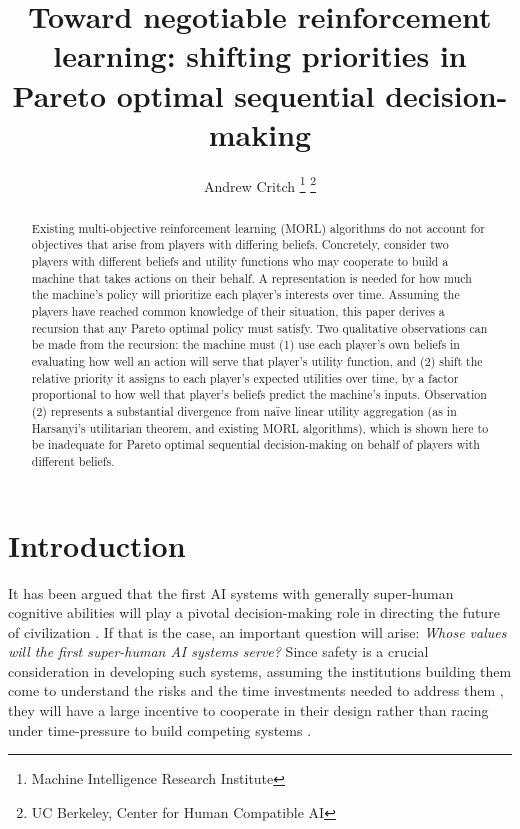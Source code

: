 \documentclass{article}  %
\title{\LARGE \bf
Toward negotiable reinforcement learning: shifting priorities in Pareto optimal sequential decision-making
}
\author{Andrew Critch%
\thanks{Machine Intelligence Research Institute}
\thanks{UC Berkeley, Center for Human Compatible AI}%
}
\begin{document}
\maketitle
\thispagestyle{empty}
\pagestyle{empty}


\begin{abstract}
Existing multi-objective reinforcement learning (MORL) algorithms do not account for objectives that arise from players with differing beliefs.  Concretely, consider two players with different beliefs and utility functions who may cooperate to build a machine that takes actions on their behalf.  A representation is needed for how much the machine's policy will prioritize each player's interests over time.  Assuming the players have reached common knowledge of their situation, this paper derives a recursion that any Pareto optimal policy must satisfy.  Two qualitative observations can be made from the recursion: the machine must (1) use each player's own beliefs in evaluating how well an action will serve that player's utility function, and (2) shift the relative priority it assigns to each player's expected utilities over time, by a factor proportional to how well that player's beliefs predict the machine's inputs.  Observation (2) represents a substantial divergence from na\"{i}ve linear utility aggregation (as in Harsanyi's utilitarian theorem, and existing MORL algorithms), which is shown here to be inadequate for Pareto optimal sequential decision-making on behalf of players with different beliefs.
\end{abstract}



\section{Introduction}

It has been argued that the first AI systems with generally super-human cognitive abilities will play a pivotal decision-making role in directing the future of civilization \citep{bostrom2014superintelligence}.  If that is the case, an important question will arise: \emph{Whose values will the first super-human AI systems serve?}  Since safety is a crucial consideration in developing such systems, assuming the institutions building them come to understand the risks and the time investments needed to address them \citep{baum2016promotion}, they will have a large incentive to cooperate in their design rather than racing under time-pressure to build competing systems \citep{armstrong2016racing}.
\end{document}
